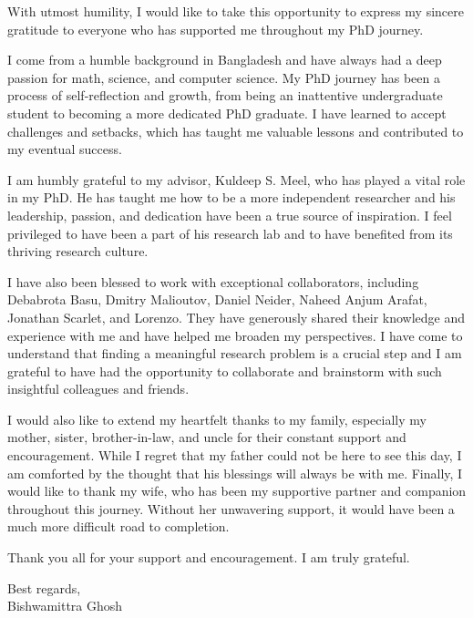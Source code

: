 \begin{acknowledgments}
	
With utmost humility, I would like to take this opportunity to express my sincere gratitude to everyone who has supported me throughout my PhD journey.

I come from a humble background in Bangladesh and have always had a deep passion for math, science, and computer science. My PhD journey has been a process of self-reflection and growth, from being an inattentive undergraduate student to becoming a more dedicated PhD graduate. I have learned to accept challenges and setbacks, which has taught me valuable lessons and contributed to my eventual success.

I am humbly grateful to my advisor, Kuldeep S. Meel, who has played a vital role in my PhD. He has taught me how to be a more independent researcher and his leadership, passion, and dedication have been a true source of inspiration. I feel privileged to have been a part of his research lab and to have benefited from its thriving research culture.

I have also been blessed to work with exceptional collaborators, including Debabrota Basu, Dmitry Malioutov, Daniel Neider, Naheed Anjum Arafat, Jonathan Scarlet, and Lorenzo. They have generously shared their knowledge and experience with me and have helped me broaden my perspectives. I have come to understand that finding a meaningful research problem is a crucial step and I am grateful to have had the opportunity to collaborate and brainstorm with such insightful colleagues and friends.

I would also like to extend my heartfelt thanks to my family, especially my mother, sister, brother-in-law, and uncle for their constant support and encouragement. While I regret that my father could not be here to see this day, I am comforted by the thought that his blessings will always be with me. Finally, I would like to thank my wife, who has been my supportive partner and companion throughout this journey. Without her unwavering support, it would have been a much more difficult road to completion.

Thank you all for your support and encouragement. I am truly grateful.

\vspace{2em}
\noindent Best regards,\\
Bishwamittra Ghosh
	
\end{acknowledgments}
